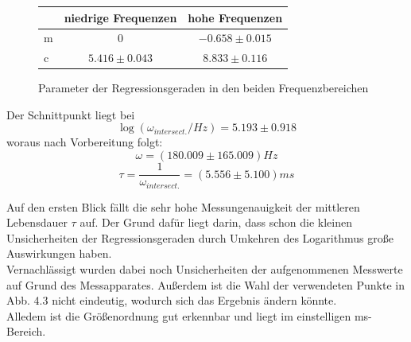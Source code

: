 \begin{figure}
\label{A4_param}
\caption{Parameter der Regressionsgeraden in den beiden Frequenzbereichen}
\vspace{0.4cm}
\begin{tabular}{lcc}
& niedrige Frequenzen & hohe Frequenzen \\ 
\hline
\hline
m & 0 & $-0.658 \pm 0.015$\\
c & $5.416 \pm 0.043$ & $8.833 \pm 0.116$ \\
\end{tabular}
\end{figure}

Der Schnittpunkt liegt bei 
$$\log(\omega _{intersect.} / Hz) = 5.193 \pm 0.918$$
woraus nach Vorbereitung folgt:
$$\omega = (180.009 \pm 165.009) Hz $$
$$\tau = \frac{1}{\omega _{intersect.}} = (5.556 \pm 5.100) ms$$

Auf den ersten Blick fällt die sehr hohe Messungenauigkeit der mittleren Lebensdauer $\tau$ auf. Der Grund dafür liegt darin, dass schon die kleinen Unsicherheiten der Regressionsgeraden durch Umkehren des Logarithmus große Auswirkungen haben. \\
Vernachlässigt wurden dabei noch Unsicherheiten der aufgenommenen Messwerte auf Grund des Messapparates. Außerdem ist die Wahl der verwendeten Punkte in Abb. 4.3 nicht eindeutig, wodurch sich das Ergebnis ändern könnte.\\
Alledem ist die Größenordnung gut erkennbar und liegt im einstelligen ms-Bereich.  

